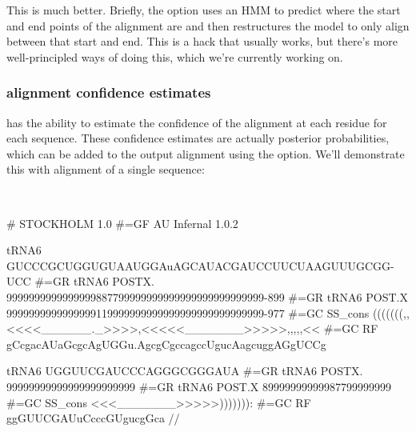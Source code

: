 This is much better. Briefly, the  option uses an HMM to
predict where the start and end points of the alignment are and then
restructures the model to only align between that start and end. This
is a hack that usually works, but there's more well-principled ways of
doing this, which we're currently working on.

\subsubsection{alignment confidence estimates}
 has the ability to estimate the confidence of the
alignment at each residue for each sequence. These confidence estimates
are actually posterior probabilities, which can be added to
the output alignment using the  option. We'll demonstrate
this with alignment of a single sequence:

\\

{\samepage
\begin{sreoutput}

# STOCKHOLM 1.0
#=GF AU Infernal 1.0.2

tRNA6             GUCCCGCUGGUGUAAUGGAuAGCAUACGAUCCUUCUAAGUUUGCGG-UCC
#=GR tRNA6 POSTX. 9999999999999999887799999999999999999999999999-899
#=GR tRNA6 POST.X 9999999999999999119999999999999999999999999999-977
#=GC SS_cons      (((((((,,<<<<______._>>>>,<<<<<_______>>>>>,,,,,<<
#=GC RF           gCcgacAUaGcgcAgUGGu.AgcgCgccagccUgucAagcuggAGgUCCg

tRNA6             UGGUUCGAUCCCAGGGCGGGAUA
#=GR tRNA6 POSTX. 99999999999999999999999
#=GR tRNA6 POST.X 89999999999987799999999
#=GC SS_cons      <<<_______>>>>>))))))):
#=GC RF           ggGUUCGAUuCcccGUgucgGca
//
\end{sreoutput}
}

